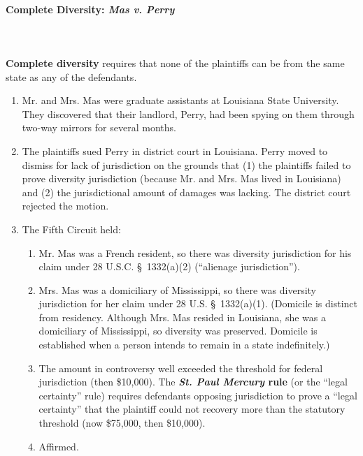 \paragraph{Complete Diversity: \emph{Mas v. Perry}}
~\\\\
\textbf{Complete diversity} requires that none of the plaintiffs can be from 
the same state as any of the defendants.

\begin{enumerate}
    \item Mr. and Mrs. Mas were graduate assistants at Louisiana State 
    University. They discovered that their landlord, Perry, had been spying on 
    them through two-way mirrors for several months.
    \item The plaintiffs sued Perry in district court in Louisiana. Perry 
    moved to dismiss for lack of jurisdiction on the grounds that (1) the 
    plaintiffs failed to prove diversity jurisdiction (because Mr. and Mrs.  
    Mas lived in Louisiana) and (2) the jurisdictional amount of damages was 
    lacking. The district court rejected the motion.
    \item The Fifth Circuit held:
    \begin{enumerate}
        \item Mr. Mas was a French resident, so there was diversity 
        jurisdiction for his claim under 28 U.S.C. \S\ 1332(a)(2) (``alienage 
        jurisdiction'').
        \item Mrs. Mas was a domiciliary of Mississippi, so there was 
        diversity jurisdiction for her claim under 28 U.S. \S\ 1332(a)(1). 
        (Domicile is distinct from residency. Although Mrs. Mas resided in 
        Louisiana, she was a domiciliary of Mississippi, so diversity was 
        preserved. Domicile is established when a person intends to remain in 
        a state indefinitely.)
        \item The amount in controversy well exceeded the threshold for 
        federal jurisdiction (then \$10,000). The \textbf{\emph{St. Paul 
        Mercury} rule} (or the ``legal certainty'' rule) requires defendants 
        opposing jurisdiction to prove a ``legal certainty'' that the 
        plaintiff could not recovery more than the statutory threshold (now 
        \$75,000, then \$10,000).
        \item Affirmed.
    \end{enumerate}
\end{enumerate}

